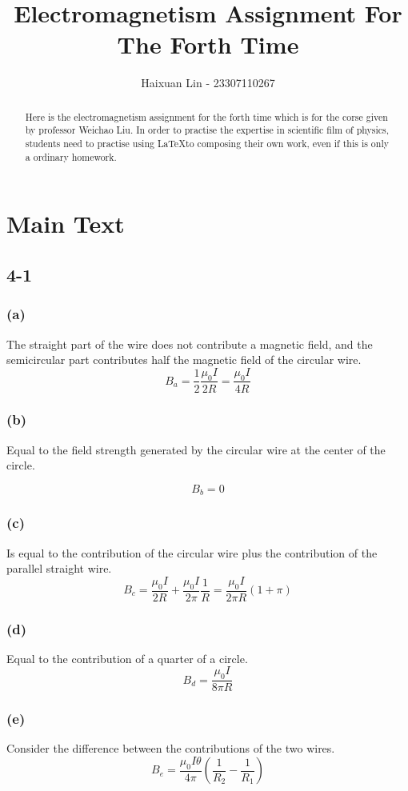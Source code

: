 \documentclass[a4paper,11pt]{amsart}
\title{Electromagnetism Assignment For The Forth Time}
\author{Haixuan Lin - 23307110267}
\theoremstyle{definition}
\begin{document}
	
	\begin{abstract}
		Here is the electromagnetism assignment for the forth time which is for the corse given by professor Weichao Liu. In order to practise the expertise in scientific film of physics, students need to practise using \LaTeX to composing their own work, even if this is only a ordinary homework.
	\end{abstract}
	
	\maketitle
	
	\section*{Main Text}
	
	\subsection*{4-1}
	\subsubsection*{(a)}
	The straight part of the wire does not contribute a magnetic field, and the semicircular part contributes half the magnetic field of the circular wire.
	$$
	B_a =  \frac{1}{2}\frac{\mu _0I}{2R}=\frac{\mu _0I}{4R}
	$$
	\subsubsection*{(b)}
	Equal to the field strength generated by the circular wire at the center of the circle.
	
	$$
	B_b = 0
	$$
	\subsubsection*{(c)}
	Is equal to the contribution of the circular wire plus the contribution of the parallel straight wire.
	$$
	B_c= \frac{\mu _0I}{2R}+\frac{\mu _0I}{2\pi}\frac{1}{R}=\frac{\mu _0I}{2\pi R}\left( 1+\pi \right)
	$$
	\subsubsection*{(d)}
	Equal to the contribution of a quarter of a circle.
	$$
    B_d=\frac{\mu _0I}{8\pi R}
	$$
	\subsubsection*{(e)}
	Consider the difference between the contributions of the two wires.
	$$
	B_e=\frac{\mu _0I\theta}{4\pi}\left( \frac{1}{R_2}-\frac{1}{R_1} \right) 
	$$
\end{document}
